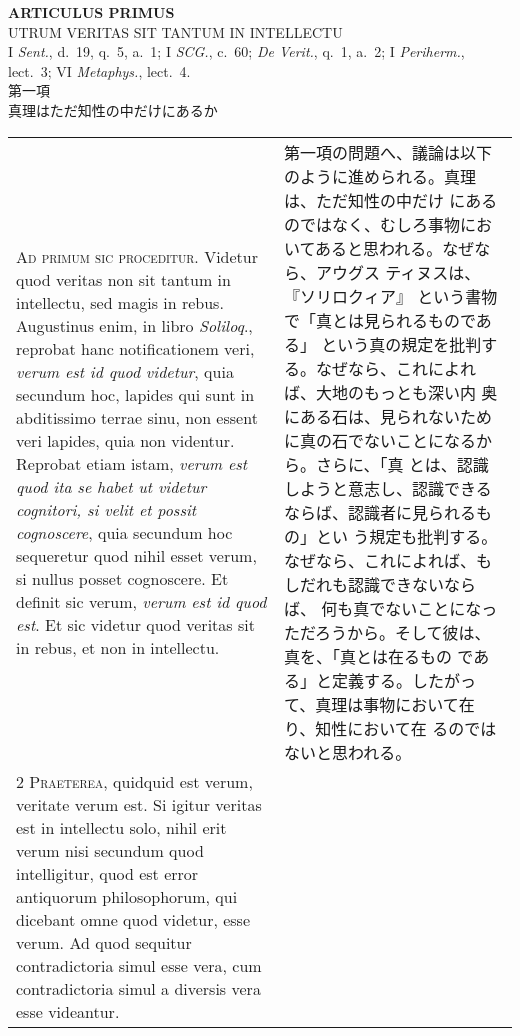 \documentclass[10pt]{jsarticle} %
\begin{document}
\newpage

\begin{center}
 {\Large {\bf ARTICULUS PRIMUS}}\\
 {\large UTRUM VERITAS SIT TANTUM IN INTELLECTU}\\
 {\footnotesize I {\itshape Sent.}, d.~19, q.~5, a.~1; I {\itshape
 SCG.}, c.~60; {\itshape De Verit.}, q.~1, a.~2; I {\itshape Periherm.},
 lect.~3; VI {\itshape Metaphys.}, lect.~4.}\\
 {\Large 第一項\\真理はただ知性の中だけにあるか}
\end{center}

\begin{longtable}{p{21em}p{21em}}



{\huge A}{\scshape d primum sic proceditur}. Videtur quod veritas non
sit tantum in intellectu, sed magis in rebus. Augustinus enim, in
libro {\itshape Soliloq}., reprobat hanc notificationem veri,
{\itshape verum est id quod videtur}, quia secundum hoc, lapides qui
sunt in abditissimo terrae sinu, non essent veri lapides, quia non
videntur. Reprobat etiam istam, {\itshape verum est quod ita se habet
ut videtur cognitori, si velit et possit cognoscere}, quia secundum
hoc sequeretur quod nihil esset verum, si nullus posset cognoscere. Et
definit sic verum, {\itshape verum est id quod est}. Et sic videtur
quod veritas sit in rebus, et non in intellectu.

&

第一項の問題へ、議論は以下のように進められる。真理は、ただ知性の中だけ
にあるのではなく、むしろ事物においてあると思われる。なぜなら、アウグス
ティヌスは、『ソリロクィア』 という書物で「真とは見られるものである」
という真の規定を批判する。なぜなら、これによれば、大地のもっとも深い内
奥にある石は、見られないために真の石でないことになるから。さらに、「真
とは、認識しようと意志し、認識できるならば、認識者に見られるもの」とい
う規定も批判する。なぜなら、これによれば、もしだれも認識できないならば、
何も真でないことになっただろうから。そして彼は、真を、「真とは在るもの
である」と定義する。したがって、真理は事物において在り、知性において在
るのではないと思われる。

\\


{\scshape 2 Praeterea}, quidquid est verum, veritate verum est. Si
igitur veritas est in intellectu solo, nihil erit verum nisi secundum
quod intelligitur, quod est error antiquorum philosophorum, qui
dicebant omne quod videtur, esse verum. Ad quod sequitur
contradictoria simul esse vera, cum contradictoria simul a diversis
vera esse videantur.



\end{longtable}
\end{document}
